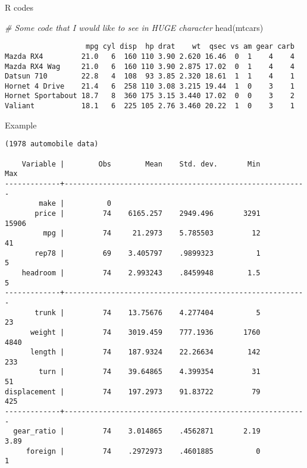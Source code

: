 \documentclass[
  10pt,
  ignorenonframetext,
]{beamer}
\newenvironment{Shaded}{\begin{snugshade}}{\end{snugshade}}
\newcommand{\CommentTok}[1]{\textcolor[rgb]{0.56,0.35,0.01}{\textit{#1}}}
\newcommand{\FunctionTok}[1]{\textcolor[rgb]{0.00,0.00,0.00}{#1}}
\newcommand{\NormalTok}[1]{#1}
\begin{document}
\begin{frame}[fragile]{R codes}
\protect\hypertarget{r-codes}{}
\footnotesize
\centering

\begin{Shaded}
\begin{Highlighting}[]
\CommentTok{\# Some code that I would like to see in HUGE character}
\FunctionTok{head}\NormalTok{(mtcars)}
\end{Highlighting}
\end{Shaded}

\begin{verbatim}
                   mpg cyl disp  hp drat    wt  qsec vs am gear carb
Mazda RX4         21.0   6  160 110 3.90 2.620 16.46  0  1    4    4
Mazda RX4 Wag     21.0   6  160 110 3.90 2.875 17.02  0  1    4    4
Datsun 710        22.8   4  108  93 3.85 2.320 18.61  1  1    4    1
Hornet 4 Drive    21.4   6  258 110 3.08 3.215 19.44  1  0    3    1
Hornet Sportabout 18.7   8  360 175 3.15 3.440 17.02  0  0    3    2
Valiant           18.1   6  225 105 2.76 3.460 20.22  1  0    3    1
\end{verbatim}
\end{frame}

\begin{frame}[fragile]{Example}
\protect\hypertarget{example}{}
\footnotesize
\centering

\begin{verbatim}
(1978 automobile data)

    Variable |        Obs        Mean    Std. dev.       Min        Max
-------------+---------------------------------------------------------
        make |          0
       price |         74    6165.257    2949.496       3291      15906
         mpg |         74     21.2973    5.785503         12         41
       rep78 |         69    3.405797    .9899323          1          5
    headroom |         74    2.993243    .8459948        1.5          5
-------------+---------------------------------------------------------
       trunk |         74    13.75676    4.277404          5         23
      weight |         74    3019.459    777.1936       1760       4840
      length |         74    187.9324    22.26634        142        233
        turn |         74    39.64865    4.399354         31         51
displacement |         74    197.2973    91.83722         79        425
-------------+---------------------------------------------------------
  gear_ratio |         74    3.014865    .4562871       2.19       3.89
     foreign |         74    .2972973    .4601885          0          1
\end{verbatim}
\end{frame}
\end{document}
